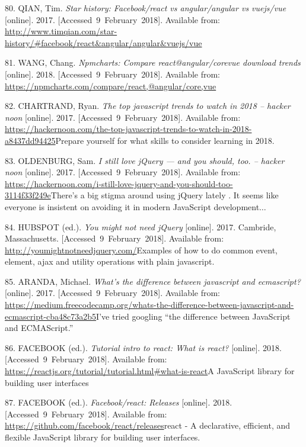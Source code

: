 \documentclass[american,a4paper,oneside,,tablecaptionabove]{scrbook}
\begin{document}
\hypertarget{ref-Qian.2017}{}
80. QIAN, Tim. \emph{Star history: Facebook/react vs angular/angular vs
vuejs/vue} {[}online{]}. 2017. {[}Accessed~9~February~2018{]}. Available
from:
\url{http://www.timqian.com/star-history/\#facebook/react\&angular/angular\&vuejs/vue}

\hypertarget{ref-Wang.2018}{}
81. WANG, Chang. \emph{Npmcharts: Compare react@angular/corevue download
trends} {[}online{]}. 2018. {[}Accessed~9~February~2018{]}. Available
from: \url{https://npmcharts.com/compare/react,@angular/core,vue}

\hypertarget{ref-Chartrand.2017}{}
82. CHARTRAND, Ryan. \emph{The top javascript trends to watch in 2018 --
hacker noon} {[}online{]}. 2017. {[}Accessed~9~February~2018{]}.
Available from:
\url{https://hackernoon.com/the-top-javascript-trends-to-watch-in-2018-a8437dd94425}Prepare
yourself for what skills to consider learning in 2018.

\hypertarget{ref-Oldenburg.2017}{}
83. OLDENBURG, Sam. \emph{I still love jQuery --- and you should, too.
-- hacker noon} {[}online{]}. 2017. {[}Accessed~9~February~2018{]}.
Available from:
\url{https://hackernoon.com/i-still-love-jquery-and-you-should-too-3114f33f249e}There's
a big stigma around using jQuery lately . It seems like everyone is
insistent on avoiding it in modern JavaScript development\(\ldots\)

\hypertarget{ref-HubSpot.2017}{}
84. HUBSPOT (ed.). \emph{You might not need jQuery} {[}online{]}. 2017.
Cambride, Massachusetts. {[}Accessed~9~February~2018{]}. Available from:
\url{http://youmightnotneedjquery.com/}Examples of how to do common
event, element, ajax and utility operations with plain javascript.

\hypertarget{ref-Aranda.2017}{}
85. ARANDA, Michael. \emph{What's the difference between javascript and
ecmascript?} {[}online{]}. 2017. {[}Accessed~9~February~2018{]}.
Available from:
\url{https://medium.freecodecamp.org/whats-the-difference-between-javascript-and-ecmascript-cba48c73a2b5}I've
tried googling ``the difference between JavaScript and ECMAScript.''

\hypertarget{ref-Facebook.2018b}{}
86. FACEBOOK (ed.). \emph{Tutorial intro to react: What is react?}
{[}online{]}. 2018. {[}Accessed~9~February~2018{]}. Available from:
\url{https://reactjs.org/tutorial/tutorial.html\#what-is-react}A
JavaScript library for building user interfaces

\hypertarget{ref-Facebook.2018}{}
87. FACEBOOK (ed.). \emph{Facebook/react: Releases} {[}online{]}. 2018.
{[}Accessed~9~February~2018{]}. Available from:
\url{https://github.com/facebook/react/releases}react - A declarative,
efficient, and flexible JavaScript library for building user interfaces.
\end{document}
